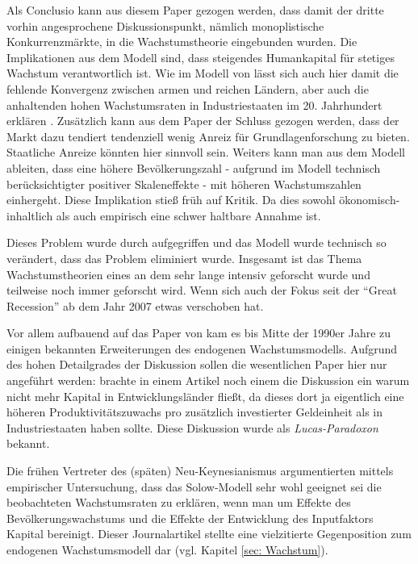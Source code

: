 Als Conclusio kann aus diesem Paper gezogen werden, dass damit der dritte vorhin angesprochene Diskussionspunkt, nämlich monoplistische Konkurrenzmärkte, in die Wachstumstheorie eingebunden wurden. Die Implikationen aus dem Modell sind, dass steigendes Humankapital für stetiges Wachstum verantwortlich ist. Wie im Modell von \textcite{Lucas1988} lässt sich auch hier damit die fehlende Konvergenz zwischen armen und reichen Ländern, aber auch die anhaltenden hohen Wachstumsraten in Industriestaaten im 20. Jahrhundert erklären \parencite{Romer1990}. Zusätzlich kann aus dem Paper der Schluss gezogen werden, dass der Markt dazu tendiert tendenziell wenig Anreiz für Grundlagenforschung zu bieten. Staatliche Anreize könnten hier sinnvoll sein. Weiters kann man aus dem Modell ableiten, dass eine höhere Bevölkerungszahl - aufgrund im Modell technisch berücksichtigter positiver Skaleneffekte - mit höheren Wachstumszahlen einhergeht. Diese Implikation stieß früh auf Kritik. Da dies sowohl ökonomisch-inhaltlich als auch empirisch eine schwer haltbare Annahme ist.

Dieses Problem wurde durch \textcite{Jones1995} aufgegriffen und das Modell wurde technisch so verändert, dass das Problem eliminiert wurde. Insgesamt ist das Thema Wachstumstheorien eines an dem sehr lange intensiv geforscht wurde und teilweise noch immer geforscht wird. Wenn sich auch der Fokus seit der "`Great Recession"' ab dem Jahr 2007 etwas verschoben hat.

Vor allem aufbauend auf das Paper von \textcite{Romer1990} kam es bis Mitte der 1990er Jahre zu einigen bekannten Erweiterungen des endogenen Wachstumsmodells. Aufgrund des hohen Detailgrades der Diskussion sollen die wesentlichen Paper hier nur angeführt werden: \textcite{Lucas1990} brachte in einem Artikel noch einem die Diskussion ein warum nicht mehr Kapital in Entwicklungsländer fließt, da dieses dort ja eigentlich eine höheren Produktivitätszuwachs pro zusätzlich investierter Geldeinheit als in Industriestaaten haben sollte. Diese Diskussion wurde als \textit{Lucas-Paradoxon} bekannt.

Die frühen Vertreter des (späten) Neu-Keynesianismus \textcite{Mankiw1992} argumentierten mittels empirischer Untersuchung, dass das Solow-Modell sehr wohl geeignet sei die beobachteten Wachstumsraten zu erklären, wenn man um Effekte des Bevölkerungswachstums und die Effekte der Entwicklung des Inputfaktors Kapital bereinigt. Dieser Journalartikel stellte eine vielzitierte Gegenposition zum endogenen Wachstumsmodell dar (vgl. Kapitel \ref{sec: Wachstum}). 

